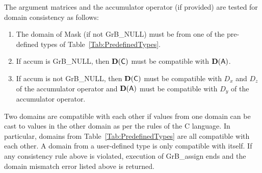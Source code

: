 The argument matrices and the accumulator 
operator (if provided) are tested for domain consistency as follows:
\begin{enumerate}
	\item The domain of {\sf Mask} (if not {\sf GrB\_NULL}) must be from one of the pre-defined types of Table~\ref{Tab:PredefinedTypes}.

	\item If {\sf accum} is {\sf GrB\_NULL}, then $\bold{D}({\sf C})$ must be 
    compatible with $\bold{D}({\sf A})$.

	\item If {\sf accum} is not {\sf GrB\_NULL}, then $\bold{D}({\sf C})$ must be
    compatible with $D_x$ and $D_z$ of the accumulator operator and 
    $\bold{D}({\sf A})$ must be compatible with $D_y$ of the accumulator operator.
\end{enumerate}
Two domains are compatible with each other if values from one domain can be cast 
to values in the other domain as per the rules of the C language.
In particular, domains from Table~\ref{Tab:PredefinedTypes} are all compatible 
with each other. A domain from a user-defined type is only compatible with itself.
If any consistency rule above is violated, execution of {\sf GrB\_assign} ends
and the domain mismatch error listed above is returned.

